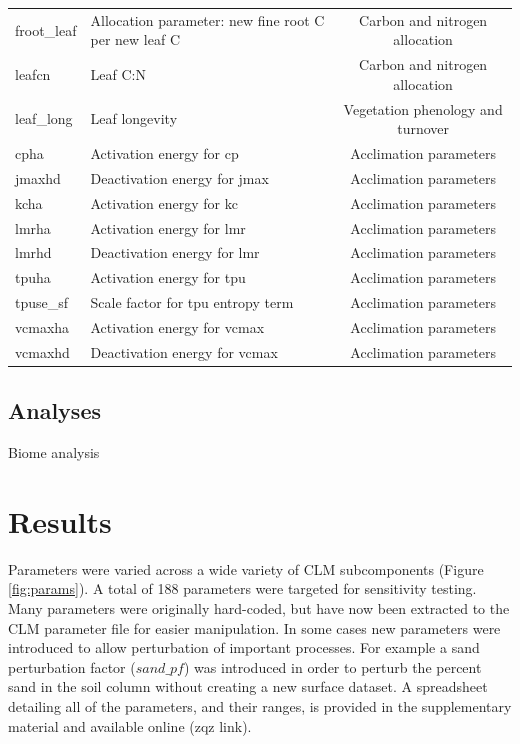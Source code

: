 \documentclass[draft]{agujournal2019}
\begin{document}
\begin{landscape}
\begin{table}[h]
\begin{tabular}{l l c}
froot\_leaf & Allocation parameter: new fine root C per new leaf C & Carbon and nitrogen allocation \\
leafcn & Leaf C:N & Carbon and nitrogen allocation \\
leaf\_long & Leaf longevity & Vegetation phenology and turnover \\
cpha & Activation energy for cp & Acclimation parameters \\
jmaxhd & Deactivation energy for jmax & Acclimation parameters \\
kcha & Activation energy for kc & Acclimation parameters \\
lmrha & Activation energy for lmr & Acclimation parameters \\
lmrhd & Deactivation energy for lmr & Acclimation parameters \\
tpuha & Activation energy for tpu & Acclimation parameters \\
tpuse\_sf & Scale factor for tpu entropy term & Acclimation parameters \\
vcmaxha & Activation energy for vcmax & Acclimation parameters \\
vcmaxhd & Deactivation energy for vcmax & Acclimation parameters \\
 \hline
 \end{tabular}
 \end{table}
\end{landscape}


\subsection{Analyses}

Biome analysis

\section{Results}

Parameters were varied across a wide variety of CLM subcomponents (Figure \ref{fig:params}). A total of 188 parameters were targeted for sensitivity testing. Many parameters were originally hard-coded, but have now been extracted to the CLM parameter file for easier manipulation. In some cases new parameters were introduced to allow perturbation of important processes. For example a sand perturbation factor ($sand\_pf$) was introduced in order to perturb the percent sand in the soil column without creating a new surface dataset. A spreadsheet detailing all of the parameters, and their ranges, is provided in the supplementary material and available online (zqz link).
\end{document}
